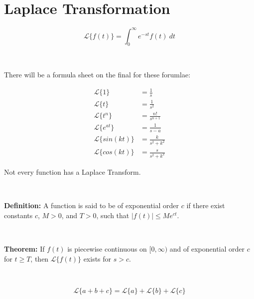 \documentclass[12pt]{article}
\begin{document}
\section*{Laplace Transformation}

\begin{equation}
\mathscr{L}\{f(t)\} = \int _0^\infty e^{-st} f(t)~dt
\end{equation}

\ 

\noindent There will be a formula sheet on the final for these forumlae:

\begin{align}
\mathscr{L}\{1\} &= \frac{1}{s}\\
\mathscr{L}\{t\} &= \frac{1}{s^2}\\
\mathscr{L}\{t^n\} &= \frac{n!}{s^{n+1}}\\
\mathscr{L}\{e^{at}\} &= \frac{1}{s-a}\\
\mathscr{L}\{sin(kt)\} &= \frac{k}{s^2+k^2}\\
\mathscr{L}\{cos(kt)\} &= \frac{s}{s^2+k^2}
\end{align}


\noindent Not every function has a Laplace Transform.


\ 

\textbf{Definition:} A function is said to be of exponential order $c$ if there exist constants $c$, $M>0$, and $T>0$, such that $|f(t)| \leq Me^{ct}$.

\ 

\textbf{Theorem:} If $f(t)$ is piecewise continuous on $[0,\infty)$ and of exponential order $c$ for $t \geq T$, then $\mathscr{L}\{f(t)\}$ exists for $s>c$.

\ 

\begin{equation}
\mathscr{L}\{a+b+c\} = \mathscr{L}\{a\} + \mathscr{L}\{b\} + \mathscr{L}\{c\}
\end{equation}
\end{document}
